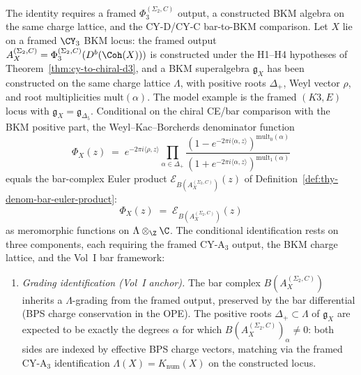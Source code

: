 \begin{theorem}[Conditional denominator \texorpdfstring{$=$}{=} bar-complex Euler product on framed BKM loci]
\label{thm:thy-denom-bar-euler}
The identity requires a framed \(\Phi_3^{(\Sigma_2,C)}\) output, a
constructed BKM algebra on the same charge lattice, and the CY-D/CY-C
bar-to-BKM comparison.
Let $X$ lie on a framed $\CY_3$ BKM locus: the framed output
$A_X^{(\Sigma_2,C)}=\Phi_3^{(\Sigma_2,C)}(D^b(\Coh(X)))$ is constructed
under the H1--H4 hypotheses of Theorem~\ref{thm:cy-to-chiral-d3}, and a
BKM superalgebra $\mathfrak{g}_X$ has been constructed on the same charge
lattice $\Lambda$, with positive roots $\Delta_+$, Weyl vector $\rho$,
and root multiplicities $\mathrm{mult}(\alpha)$. The model example is
the framed $(K3,E)$ locus with $\mathfrak g_X=\mathfrak g_{\Delta_5}$.
Conditional on the chiral CE/bar comparison with the BKM positive
part, the Weyl--Kac--Borcherds denominator function
\[
 \Phi_X(z) \;=\; e^{-2\pi i\langle \rho, z\rangle}
 \prod_{\alpha \in \Delta_+}
 \frac{(1 - e^{-2\pi i\langle\alpha,z\rangle})^{\mathrm{mult}_0(\alpha)}}
 {(1 + e^{-2\pi i\langle\alpha,z\rangle})^{\mathrm{mult}_1(\alpha)}}
\]
equals the bar-complex Euler product $\mathcal{E}_{B(A_X^{(\Sigma_2,C)})}(z)$ of Definition~\ref{def:thy-denom-bar-euler-product}:
\begin{equation}
 \label{eq:thy-super-denom}
 \boxed{\Phi_X(z) \;=\; \mathcal{E}_{B(A_X^{(\Sigma_2,C)})}(z)}
\end{equation}
as meromorphic functions on $\Lambda \otimes_\Z \C$. The conditional
identification rests on three components, each requiring the framed CY-A$_3$
output, the BKM charge lattice, and the Vol~I bar framework:

\begin{enumerate}[label=\textup{(S\arabic*)}]
\item \emph{Grading identification \textup{(}Vol~I anchor\textup{)}.} The bar complex $B(A_X^{(\Sigma_2,C)})$ inherits a $\Lambda$-grading from the framed output, preserved by the bar differential (BPS charge conservation in the OPE). The positive roots $\Delta_+ \subset \Lambda$ of $\mathfrak{g}_X$ are expected to be exactly the degrees $\alpha$ for which $B(A_X^{(\Sigma_2,C)})_\alpha \neq 0$: both sides are indexed by effective BPS charge vectors, matching via the framed CY-A$_3$ identification $\Lambda(X) = K_{\mathrm{num}}(X)$ on the constructed locus.


\end{enumerate}
\end{theorem}
